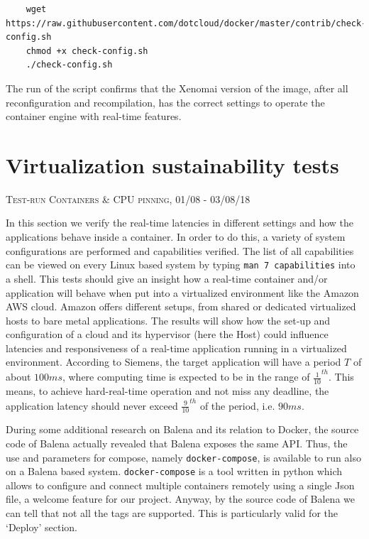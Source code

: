 \documentclass[]{scrartcl}
\begin{document}
\begin{verbatim}
	wget https://raw.githubusercontent.com/dotcloud/docker/master/contrib/check-config.sh
	chmod +x check-config.sh
	./check-config.sh
\end{verbatim}

The run of the script confirms that the Xenomai version of the image, after all reconfiguration and recompilation, has the correct settings to operate the container engine with real-time features.

\section{Virtualization sustainability tests}
\label{sec:virtsust}
{\small\textsc{Test-run Containers \& CPU pinning, 01/08 - 03/08/18} \bigskip}

In this section we verify the real-time latencies in different settings and how the applications behave inside a container. In order to do this, a variety of system configurations are performed and capabilities verified. 
The list of all capabilities can be viewed on every Linux based system by typing \texttt{man 7 capabilities} into a shell. 
This tests should give an insight how a real-time container and/or application will behave when put into a virtualized environment like the Amazon AWS cloud. Amazon offers different setups, from shared or dedicated virtualized hosts to bare metal applications. 
The results will show how the set-up and configuration of a cloud and its  hypervisor (here the Host) could influence latencies and responsiveness of a real-time application running in a virtualized environment. 
According to Siemens, the target application will have a period $T$ of about $100 ms$, where computing time is expected to be in the range of $\frac{1}{10}^{th}$. This means, to achieve hard-real-time operation and not miss any deadline, the application latency should never exceed $\frac{9}{10}^{th}$ of the period, i.e. $90 ms$.

During some additional research on Balena and its relation to Docker, the source code of Balena actually revealed that Balena exposes the same API. Thus, the use and parameters for compose, namely \texttt{docker-compose}, is available to run also on a Balena based system.
\texttt{docker-compose} is a tool written in python which allows to configure and connect multiple containers remotely using a single Json file, a welcome feature for our project.
Anyway, by the source code of Balena we can tell that not all the tags are supported. This is particularly valid for the `Deploy' section. 
\end{document}
